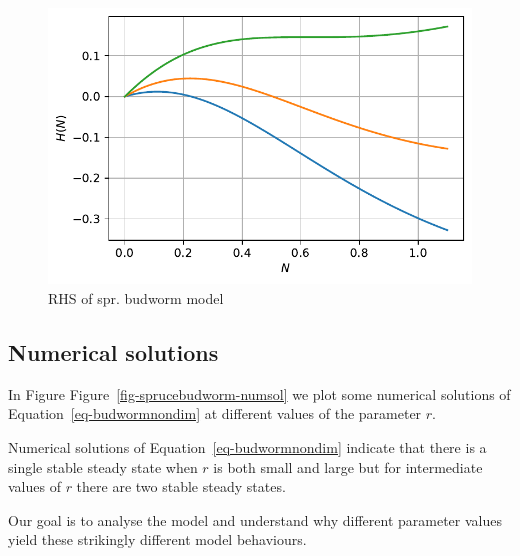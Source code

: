 \documentclass[
  letterpaper,
  DIV=11,
  numbers=noendperiod]{scrreprt}
\begin{document}
\begin{figure}

{\centering \includegraphics{SinglePopODEMOdels_files/figure-pdf/fig-sprucebudworm-rhs-output-1.pdf}

}

\caption{\label{fig-sprucebudworm-rhs}RHS of spr. budworm model}

\end{figure}

\hypertarget{numerical-solutions-1}{%
\subsection{Numerical solutions}\label{numerical-solutions-1}}

In Figure Figure~\ref{fig-sprucebudworm-numsol} we plot some numerical
solutions of Equation~\ref{eq-budwormnondim} at different values of the
parameter \(r\).

Numerical solutions of Equation~\ref{eq-budwormnondim} indicate that
there is a single stable steady state when \(r\) is both small and large
but for intermediate values of \(r\) there are two stable steady states.

Our goal is to analyse the model and understand why different parameter
values yield these strikingly different model behaviours.
\end{document}
